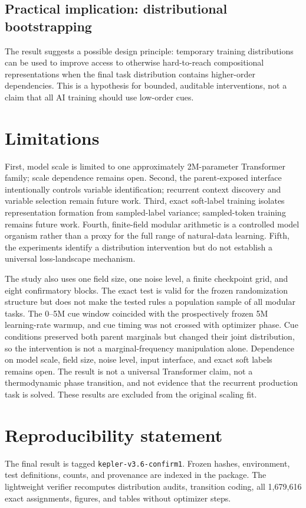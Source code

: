 \documentclass[11pt]{article}
\begin{document}
\subsection{Practical implication: distributional bootstrapping}
The result suggests a possible design principle: temporary training
distributions can be used to improve access to otherwise hard-to-reach
compositional representations when the final task distribution contains
higher-order dependencies. This is a hypothesis for bounded, auditable
interventions, not a claim that all AI training should use low-order cues.

\section{Limitations}
First, model scale is limited to one approximately 2M-parameter Transformer
family; scale dependence remains open. Second, the parent-exposed interface
intentionally controls variable identification; recurrent context discovery
and variable selection remain future work. Third, exact soft-label training
isolates representation formation from sampled-label variance; sampled-token
training remains future work. Fourth, finite-field modular arithmetic is a
controlled model organism rather than a proxy for the full range of
natural-data learning. Fifth, the experiments identify a distribution
intervention but do not establish a universal loss-landscape mechanism.

The study also uses one field size, one noise level, a finite checkpoint grid,
and eight confirmatory blocks. The exact test is valid for the frozen
randomization structure but does not make the tested rules a population sample
of all modular tasks. The 0--5M cue window coincided with the prospectively
frozen 5M learning-rate warmup, and cue timing was not crossed with optimizer
phase. Cue conditions preserved both parent marginals but changed their joint
distribution, so the intervention is not a marginal-frequency manipulation
alone. Dependence on model scale, field size, noise level, input interface, and
exact soft labels remains open. The result is not a universal Transformer
claim, not a thermodynamic phase transition, and not evidence that the
recurrent production task is solved. These results are excluded from the
original scaling fit.

\section{Reproducibility statement}
The final result is tagged \texttt{kepler-v3.6-confirm1}. Frozen hashes,
environment, test definitions, counts, and provenance are indexed in the
package. The lightweight verifier recomputes distribution audits, transition
coding, all 1,679,616 exact assignments, figures,
and tables without optimizer steps.
\end{document}
